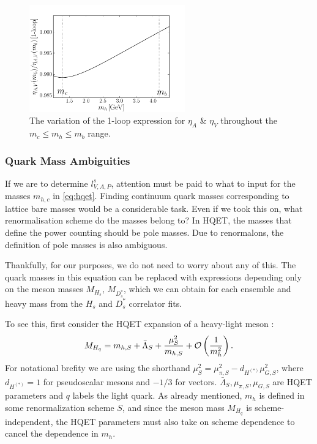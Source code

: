 \begin{figure}[htb!]
  \begin{center}
  \includegraphics[width=0.6\textwidth]{images/BsDsstar/etaAV.pdf}
  \caption{The variation of the 1-loop expression for $\eta_{A}$ \& $\eta_V$ throughout the $m_c \leq m_h \leq m_b$ range. \label{fig:etaAV}}
  \end{center}
  \vspace{-10pt}
\end{figure}

\subsubsection{Quark Mass Ambiguities}
\label{sec:massambiguities}

If we are to determine $l_{V,A,P}^s$, attention must be paid to what to input for the masses $m_{h,c}$ in \eqref{eq:hqet}. Finding continuum quark masses corresponding to lattice bare masses would be a considerable task. Even if we took this on, what renormalisation scheme do the masses belong to? In HQET, the masses that define the power counting should be pole masses. Due to renormalons, the definition of pole masses is also ambiguous.

Thankfully, for our purposes, we do not need to worry about any of this. The quark masses in this equation can be replaced with expressions depending only on the meson masses $M_{H_s}$, $M_{D_s^*}$, which we can obtain for each ensemble and heavy mass from the $H_s$ and $D_s^*$ correlator fits.

To see this, first consider the HQET expansion of a heavy-light meson \cite{Bazavov:2018omf}:
\begin{align}
  \label{eq:hqet_mass}
  M_{H_q} = m_{h,S} + \bar{\Lambda}_S + { \mu^2_S \over m_{h,S}} + \mathcal{O}\left({1\over m_h^2}\right).
\end{align}
For notational brefity we are using the shorthand $\mu_S^2 = \mu^2_{\pi,S} - d_{H^{(*)}} \mu^2_{G,S}$, where $d_{H^{(*)}} = 1$ for pseudoscalar mesons and $-1/3$ for vectors. $\bar{\Lambda}_S,\mu_{\pi,S},\mu_{G,S}$ are HQET parameters and $q$ labels the light quark. As already mentioned, $m_h$ is defined in some renormalization scheme $S$, and since the meson mass $M_{H_q}$ is scheme-independent, the HQET parameters must also take on scheme dependence to cancel the dependence in $m_h$.

